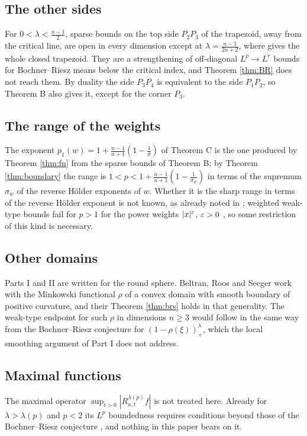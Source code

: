 \subsection{The other sides}
For $0<\lambda<\frac{n-1}2$, sparse bounds on the top side $P_2P_3$ of the trapezoid, away from the
critical line, are open in every dimension except at $\lambda=\frac{n-1}{2n+2}$, where
\cite[Theorem 1.5]{BRS25} gives the whole closed trapezoid. They are a
strengthening of off-diagonal $L^p\to L^r$ bounds for Bochner--Riesz means below the critical index,
and Theorem \ref{thm:BR} does not reach them. By duality the side $P_3P_4$ is equivalent to the side
$P_1P_2$, so Theorem B also gives it, except for the corner $P_3$.

\subsection{The range of the weights}
The exponent $p_1(w)=1+\frac{n-1}{n+1}(1-\frac1\sigma)$ of Theorem C is the one produced by Theorem
\ref{thm:fn} from the sparse bounds of Theorem B; by Theorem \ref{thm:boundary} the range is
$1<p<1+\frac{n-1}{n+1}(1-\frac1{\sigma_w})$ in terms of the supremum $\sigma_w$ of the reverse
H\"older exponents of $w$. Whether it is the sharp range in terms of the reverse
H\"older exponent is not known, as already noted in \cite[\S1.1]{BRS25}; weighted weak-type bounds
fail for $p>1$ for the power weights $|x|^\varepsilon$, $\varepsilon>0$ \cite[\S1.1]{BRS25}, so some restriction of
this kind is necessary.

\subsection{Other domains}
Parts I and II are written for the round sphere. Beltran, Roos and Seeger work with the Minkowski
functional $\rho$ of a convex domain with smooth boundary of positive curvature, and their
Theorem \ref{thm:brs} holds in that generality. The weak-type endpoint for such $\rho$ in dimensions
$n\ge3$ would follow in the same way from the Bochner--Riesz conjecture for $(1-\rho(\xi))^\lambda_+$,
which the local smoothing argument of Part I does not address.

\subsection{Maximal functions}
The maximal operator $\sup_{t>0}|R^{\lambda(p)}_{a,t}f|$ is not treated here. Already for
$\lambda>\lambda(p)$ and $p<2$ its $L^p$ boundedness requires conditions beyond those of the
Bochner--Riesz conjecture \cite{Tao02}, and nothing in this paper bears on it.
